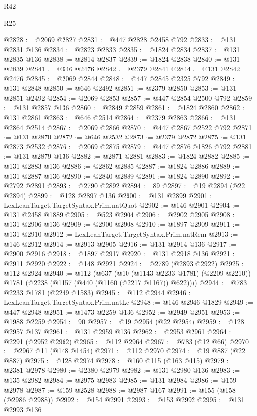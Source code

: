 \begin{lexlean}{R42}
\begin{lexlean}{R25}
\begin{coremodule}
{{{{{{{{{{{{{{{{{{{{{{{{{{{{{{{{{{{{{{{{{{{{{{{{{{{{{{{{{{{{{{{{{{{{{{{{{{{{{{{{{{{{{{{{{{{{{{{{{{{{{{{{{{{{{{{{{{{{{{{{{{{{{{{{{{{{{{{{{{{{{{{{{{{{{{{{{{{{{{{{{{{{{{{{{{{{{{{{{{{{{{{{{{{{{{{{{{{{{{{@2828 := @2069 @2827
@2831 := @447 @2828 @2458 @792
@2833 := @131 @2831 @136
@2834 := @2823 @2833
@2835 := @1824 @2834
@2837 := @131 @2835 @136
@2838 := @2814 @2837
@2839 := @1824 @2838
@2840 := @131 @2839
@2841 := @646 @2476
@2842 := @2379 @2841
@2844 := @131 @2842 @2476
@2845 := @2069 @2844
@2848 := @447 @2845 @2325 @792
@2849 := @131 @2848
@2850 := @646 @2492
@2851 := @2379 @2850
@2853 := @131 @2851 @2492
@2854 := @2069 @2853
@2857 := @447 @2854 @2500 @792
@2859 := @131 @2857 @136
@2860 := @2849 @2859
@2861 := @1824 @2860
@2862 := @131 @2861
@2863 := @646 @2514
@2864 := @2379 @2863
@2866 := @131 @2864 @2514
@2867 := @2069 @2866
@2870 := @447 @2867 @2522 @792
@2871 := @131 @2870
@2872 := @646 @2532
@2873 := @2379 @2872
@2875 := @131 @2873 @2532
@2876 := @2069 @2875
@2879 := @447 @2876 @1826 @792
@2881 := @131 @2879 @136
@2882 := @2871 @2881
@2883 := @1824 @2882
@2885 := @131 @2883 @136
@2886 := @2862 @2885
@2887 := @1824 @2886
@2889 := @131 @2887 @136
@2890 := @2840 @2889
@2891 := @1824 @2890
@2892 := @2792 @2891
@2893 := @2790 @2892
@2894 := 89
@2897 := @19 @2894 (@22 @2894)
@2899 := @128 @2897 @136
@2900 := @131 @2899
@2901 := LexLeanTarget.TargetSyntax.Prim.natQuot
@2902 := @146 @2901
@2904 := @131 @2458 @1889
@2905 := @523 @2904
@2906 := @2902 @2905
@2908 := @131 @2906 @136
@2909 := @2900 @2908
@2910 := @1897 @2909
@2911 := @131 @2910
@2912 := LexLeanTarget.TargetSyntax.Prim.natRem
@2913 := @146 @2912
@2914 := @2913 @2905
@2916 := @131 @2914 @136
@2917 := @2900 @2916
@2918 := @1897 @2917
@2920 := @131 @2918 @136
@2921 := @2911 @2920
@2922 := @148 @2921
@2924 := @2789 (@2893 @2922)
@2925 := @112 @2924
@2940 := @112
    (@637
      (@10 (@1143 @2233 @1781) (@2209 @2210))
      @1781
      (@2238 (@1157 (@440 (@1160 (@2217 @1167)) @622))))
@2944 := @783 @2233 @1781 (@2249 @1583)
@2945 := @112 @2944
@2946 := LexLeanTarget.TargetSyntax.Prim.natLe
@2948 := @146 @2946 @1829
@2949 := @447 @2948
@2951 := @1473 @2259 @136
@2952 := @2949 @2951
@2953 := @1988 @2259
@2954 := 90
@2957 := @19 @2954 (@22 @2954)
@2959 := @128 @2957 @137
@2961 := @131 @2959 @136
@2962 := @2953 @2961
@2964 := @2291 (@2952 @2962)
@2965 := @112 @2964
@2967 := @783 (@12 @66)
@2970 := @2967 @11 (@148 @1454)
@2971 := @112 @2970
@2974 := @19 @887 (@22 @887)
@2975 := @128 @2974
@2978 := @160 @115 (@163 @115)
@2979 := @2381 @2978
@2980 := @2380 @2979
@2982 := @131 @2980 @136
@2983 := @135 @2982
@2984 := @2975 @2983
@2985 := @131 @2984
@2986 := @159 @2978
@2987 := @159 @2528
@2988 := @2987 @167
@2991 := @155 (@158 (@2986 @2988))
@2992 := @154 @2991
@2993 := @153 @2992
@2995 := @131 @2993 @136
}}}}}}}}}}}}}}}}}}}}}}}}}}}}}}}}}}}}}}}}}}}}}}}}}}}}}}}}}}}}}}}}}}}}}}}}}}}}}}}}}}}}}}}}}}}}}}}}}}}}}}}}}}}}}}}}}}}}}}}}}}}}}}}}}}}}}}}}}}}}}}}}}}}}}}}}}}}}}}}}}}}}}}}}}}}}}}}}}}}}}}}}}}}}}}}}}}}}}}}
\end{coremodule}
\end{lexlean}
\end{lexlean}
